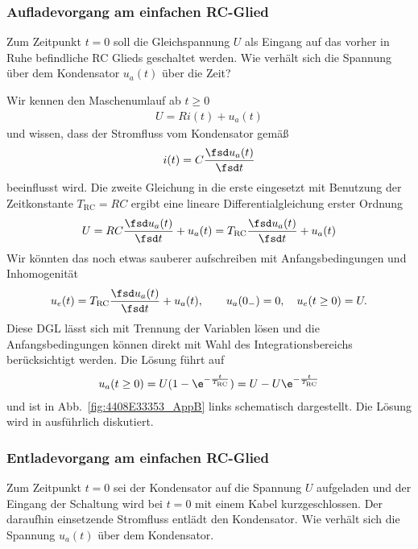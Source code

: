 \subsubsection*{Aufladevorgang am einfachen RC-Glied}

Zum Zeitpunkt $t=0$ soll die Gleichspannung $U$ als Eingang auf das vorher in
Ruhe befindliche RC Glieds geschaltet werden.
%
Wie verhält sich die Spannung über dem Kondensator $u_a(t)$ über die Zeit?

Wir kennen den Maschenumlauf ab $t\geq 0$
\begin{align}
U = R i(t) + u_a(t)
\end{align}
und wissen, dass der Stromfluss vom Kondensator gemäß
\begin{align}
i(t) = C \frac{\fsd u_a(t)}{\fsd t}
\end{align}
beeinflusst wird.
Die zweite Gleichung in die erste eingesetzt mit Benutzung der Zeitkonstante
$T_\text{RC} = R C$ ergibt eine lineare Differentialgleichung erster Ordnung
\begin{align}
U = R C \frac{\fsd u_a(t)}{\fsd t} + u_a(t) =
T_\text{RC} \frac{\fsd u_a(t)}{\fsd t} + u_a(t)
\end{align}
Wir könnten das noch etwas sauberer aufschreiben mit Anfangsbedingungen
und Inhomogenität
\begin{align}
u_e(t) = T_\text{RC} \frac{\fsd u_a(t)}{\fsd t} + u_a(t),
\qquad u_a(0_-)=0,\quad u_e(t\geq 0) = U.
\end{align}
Diese DGL lässt sich mit Trennung der Variablen lösen und die Anfangsbedingungen
können direkt mit Wahl des Integrationsbereichs berücksichtigt werden.
%
Die Lösung führt auf
\begin{align}
u_a(t \geq 0) = U(1-\e^{-\frac{t}{T_\text{RC}}}) = U - U\e^{-\frac{t}{T_\text{RC}}}
\end{align}
und ist in Abb.~\ref{fig:4408E33353_AppB} links schematisch dargestellt.
%
Die Lösung wird in \cite[Lap. 15.4.4]{Marinescu2020} ausführlich diskutiert.

\subsubsection*{Entladevorgang am einfachen RC-Glied}

Zum Zeitpunkt $t=0$ sei der Kondensator auf die Spannung $U$ aufgeladen und
der Eingang der Schaltung wird bei $t=0$ mit einem Kabel kurzgeschlossen.
Der daraufhin einsetzende Stromfluss entlädt den Kondensator.
Wie verhält sich die Spannung $u_a(t)$ über dem Kondensator.

